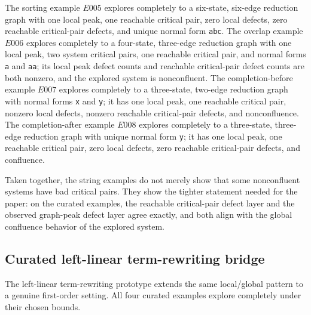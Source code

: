\documentclass[11pt]{article}
\numberwithin{equation}{section}
\theoremstyle{definition}
\theoremstyle{remark}
\begin{document}
The sorting example $E005$ explores completely to a six-state, six-edge reduction graph with one local peak, one reachable critical pair, zero local defects, zero reachable critical-pair defects, and unique normal form \texttt{abc}. The overlap example $E006$ explores completely to a four-state, three-edge reduction graph with one local peak, two system critical pairs, one reachable critical pair, and normal forms \texttt{a} and \texttt{aa}; its local peak defect counts and reachable critical-pair defect counts are both nonzero, and the explored system is nonconfluent. The completion-before example $E007$ explores completely to a three-state, two-edge reduction graph with normal forms \texttt{x} and \texttt{y}; it has one local peak, one reachable critical pair, nonzero local defects, nonzero reachable critical-pair defects, and nonconfluence. The completion-after example $E008$ explores completely to a three-state, three-edge reduction graph with unique normal form \texttt{y}; it has one local peak, one reachable critical pair, zero local defects, zero reachable critical-pair defects, and confluence.

Taken together, the string examples do not merely show that some nonconfluent systems have bad critical pairs. They show the tighter statement needed for the paper: on the curated examples, the reachable critical-pair defect layer and the observed graph-peak defect layer agree exactly, and both align with the global confluence behavior of the explored system.

\subsection{Curated left-linear term-rewriting bridge}
\label{subsec:curated-trs-bridge}

The left-linear term-rewriting prototype extends the same local/global pattern to a genuine first-order setting. All four curated examples explore completely under their chosen bounds.
\end{document}
